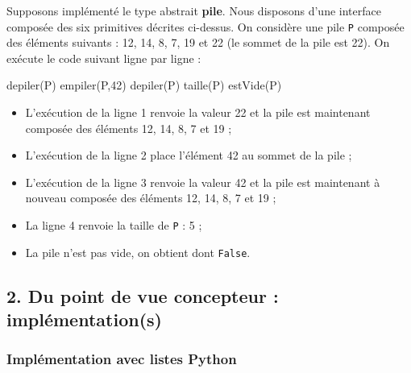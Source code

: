 \documentclass[
  a4paper,
  DIV=11,
  numbers=noendperiod]{scrartcl}
\newenvironment{Shaded}{\begin{snugshade}}{\end{snugshade}}
\newcommand{\DecValTok}[1]{\textcolor[rgb]{0.68,0.00,0.00}{#1}}
\newcommand{\NormalTok}[1]{\textcolor[rgb]{0.00,0.23,0.31}{#1}}
\providecommand{\tightlist}{%
  \setlength{\itemsep}{0pt}\setlength{\parskip}{0pt}}\usepackage{longtable,booktabs,array}
\begin{document}
\begin{tcolorbox}[enhanced jigsaw, opacitybacktitle=0.6, toprule=.15mm, leftrule=.75mm, opacityback=0, colbacktitle=quarto-callout-caution-color!10!white, title=\textcolor{quarto-callout-caution-color}{\faFire}\hspace{0.5em}{Exemple}, bottomtitle=1mm, breakable, coltitle=black, left=2mm, rightrule=.15mm, toptitle=1mm, colback=white, bottomrule=.15mm, titlerule=0mm, arc=.35mm]

Supposons implémenté le type abstrait \textbf{pile}. Nous disposons
d'une interface composée des six primitives décrites ci-dessus. On
considère une pile \texttt{P} composée des éléments suivants : 12, 14,
8, 7, 19 et 22 (le sommet de la pile est 22). On exécute le code suivant
ligne par ligne :

\begin{Shaded}
\begin{Highlighting}[numbers=left,,]
\NormalTok{    depiler(P)}
\NormalTok{    empiler(P,}\DecValTok{42}\NormalTok{)}
\NormalTok{    depiler(P)}
\NormalTok{    taille(P)}
\NormalTok{    estVide(P)}
\end{Highlighting}
\end{Shaded}

\begin{itemize}
\tightlist
\item
  L'exécution de la ligne 1 renvoie la valeur 22 et la pile est
  maintenant composée des éléments 12, 14, 8, 7 et 19 ;
\item
  L'exécution de la ligne 2 place l'élément 42 au sommet de la pile ;
\item
  L'exécution de la ligne 3 renvoie la valeur 42 et la pile est
  maintenant à nouveau composée des éléments 12, 14, 8, 7 et 19 ;
\item
  La ligne 4 renvoie la taille de \texttt{P} : 5 ;
\item
  La pile n'est pas vide, on obtient dont \texttt{False}.
\end{itemize}

\end{tcolorbox}

\hypertarget{du-point-de-vue-concepteur-impluxe9mentations}{%
\subsection{2. Du point de vue concepteur :
implémentation(s)}\label{du-point-de-vue-concepteur-impluxe9mentations}}

\hypertarget{impluxe9mentation-avec-listes-python}{%
\subsubsection{Implémentation avec listes
Python}\label{impluxe9mentation-avec-listes-python}}
\end{document}
